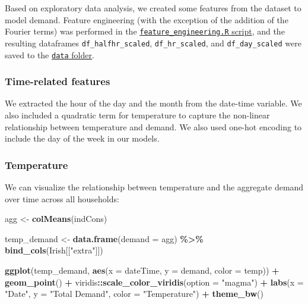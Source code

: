 \documentclass[
]{article}
\newenvironment{Shaded}{\begin{snugshade}}{\end{snugshade}}
\newcommand{\DataTypeTok}[1]{\textcolor[rgb]{0.13,0.29,0.53}{#1}}
\newcommand{\KeywordTok}[1]{\textcolor[rgb]{0.13,0.29,0.53}{\textbf{#1}}}
\newcommand{\NormalTok}[1]{#1}
\newcommand{\OperatorTok}[1]{\textcolor[rgb]{0.81,0.36,0.00}{\textbf{#1}}}
\newcommand{\StringTok}[1]{\textcolor[rgb]{0.31,0.60,0.02}{#1}}
\begin{document}
Based on exploratory data analysis, we created some features from the
dataset to model demand. Feature engineering (with the exception of the
addition of the Fourier terms) was performed in the
\href{https://github.com/Shermjj/SC-2-Electric-Boogalo/blob/main/feature_engineering.R}{\texttt{feature\_engineering.R}
script}, and the resulting dataframes \texttt{df\_halfhr\_scaled},
\texttt{df\_hr\_scaled}, and \texttt{df\_day\_scaled} were saved to the
\href{https://github.com/Shermjj/SC-2-Electric-Boogalo/tree/main/data}{\texttt{data}
folder}.

\hypertarget{time-related-features}{%
\subsubsection{Time-related features}\label{time-related-features}}

We extracted the hour of the day and the month from the date-time
variable. We also included a quadratic term for temperature to capture
the non-linear relationship between temperature and demand. We also used
one-hot encoding to include the day of the week in our models.

\hypertarget{temperature}{%
\subsubsection{Temperature}\label{temperature}}

We can visualize the relationship between temperature and the aggregate
demand over time across all households:

\begin{Shaded}
\begin{Highlighting}[]
\NormalTok{agg \textless{}{-}}\StringTok{ }\KeywordTok{colMeans}\NormalTok{(indCons)}

\NormalTok{temp\_demand \textless{}{-}}\StringTok{ }\KeywordTok{data.frame}\NormalTok{(}\DataTypeTok{demand =}\NormalTok{ agg) }\OperatorTok{\%\textgreater{}\%}
\StringTok{  }\KeywordTok{bind\_cols}\NormalTok{(Irish[[}\StringTok{"extra"}\NormalTok{]])}

\KeywordTok{ggplot}\NormalTok{(temp\_demand, }\KeywordTok{aes}\NormalTok{(}\DataTypeTok{x =}\NormalTok{ dateTime, }\DataTypeTok{y =}\NormalTok{ demand, }\DataTypeTok{color =}\NormalTok{ temp)) }\OperatorTok{+}
\StringTok{  }\KeywordTok{geom\_point}\NormalTok{() }\OperatorTok{+}
\StringTok{  }\NormalTok{viridis}\OperatorTok{::}\KeywordTok{scale\_color\_viridis}\NormalTok{(}\DataTypeTok{option =} \StringTok{"magma"}\NormalTok{) }\OperatorTok{+}
\StringTok{  }\KeywordTok{labs}\NormalTok{(}\DataTypeTok{x =} \StringTok{"Date"}\NormalTok{, }\DataTypeTok{y =} \StringTok{"Total Demand"}\NormalTok{, }\DataTypeTok{color =} \StringTok{"Temperature"}\NormalTok{) }\OperatorTok{+}
\StringTok{  }\KeywordTok{theme\_bw}\NormalTok{()}
\end{Highlighting}
\end{Shaded}
\end{document}
